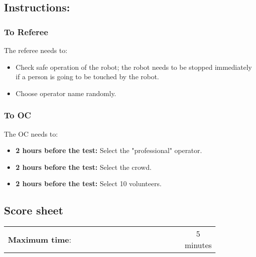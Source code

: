 \subsection*{Instructions:}
\subsubsection*{To Referee}

The referee needs to:
\begin{itemize}
	\item Check safe operation of the robot; the robot needs to be stopped immediately if a person is going to be touched by the robot.
	\item Choose operator name randomly.
\end{itemize}

\subsubsection*{To OC}
The OC needs to:
\begin{itemize}
    \item \textbf{2 hours before the test:} Select the "professional" operator.
    \item \textbf{2 hours before the test:} Select the crowd.	
	\item \textbf{2 hours before the test:} Select 10 volunteers. 

	 
\end{itemize}

\newpage
\subsection*{Score sheet}

\begin{table}[h]
	\begin{tabular}{m{0.85\linewidth} c}
		\textbf{Maximum time}: & 5 minutes \\
	\end{tabular}
\end{table}

\begin{scorelist}

	




\end{scorelist}

\clearpage
